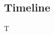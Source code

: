 \documentclass[12pt]{article}
\newif\ifdraft
\begin{document}
\subsection{Timeline}

T






% 
% 
% 
% 
% 
% 
% 

\ifdraft
\appendix
% 
\fi




\end{document}
